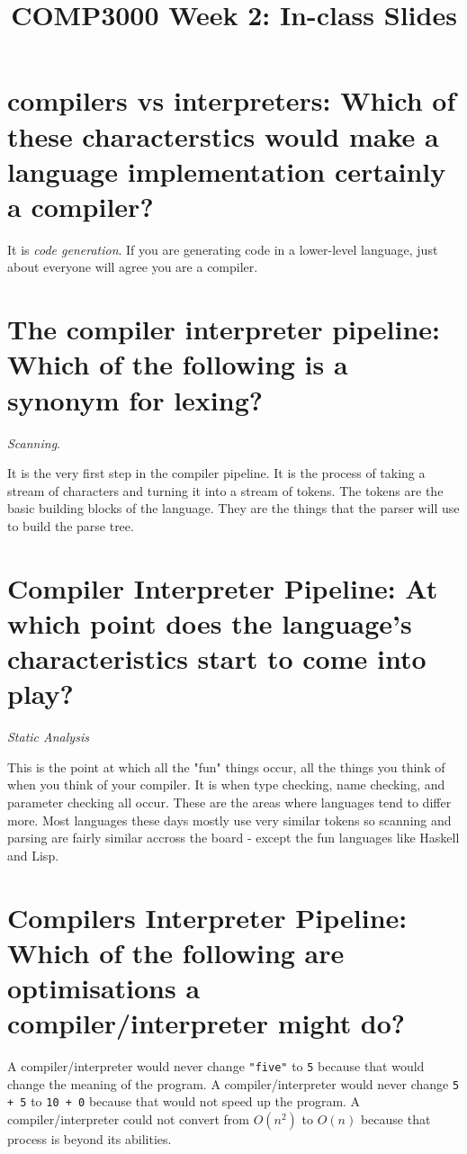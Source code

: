\documentclass[
paper=160mm:90mm, %
paper=landscape,
fontsize=11pt, %
pagesize, %
parskip=half-, %
]{scrartcl} %
\title{\color{redish} \vspace{-1em}COMP3000 Week 2: In-class Slides}
\begin{document}
{\color{blackish}\maketitle}


\newpage\section*{compilers vs interpreters: Which of these characterstics would make a language implementation certainly a compiler?}
It is \emph{code generation}.  If you are generating code in a lower-level language, just about everyone will agree you are a compiler.

\section{The compiler interpreter pipeline: Which of the following is a synonym for lexing?}
\emph{Scanning}.

It is the very first step in the compiler pipeline. It is the process of taking a stream of characters and turning it into a stream of tokens. The tokens are the basic building blocks of the language. They are the things that the parser will use to build the parse tree.

\section{Compiler Interpreter Pipeline: At which point does the language's characteristics start to come into play?}
\emph{Static Analysis}

This is the point at which all the "fun" things occur, all the things you think of when you think of your compiler.  It is when type checking, name checking, and parameter checking all occur.  These are the areas where languages tend to differ more.  Most languages these days mostly use very similar tokens so scanning and parsing are fairly similar accross the board - except the fun languages like Haskell and Lisp.

\section{Compilers Interpreter Pipeline: Which of the following are optimisations a compiler/interpreter might do?}
A compiler/interpreter would never change \verb|"five"| to \verb|5| because that would change the meaning of the program.  A compiler/interpreter would never change \verb|5 + 5| to \verb|10 + 0| because that would not speed up the program.  A compiler/interpreter could not convert from $O(n^2)$ to $O(n)$ because that process is beyond its abilities.
\end{document}
